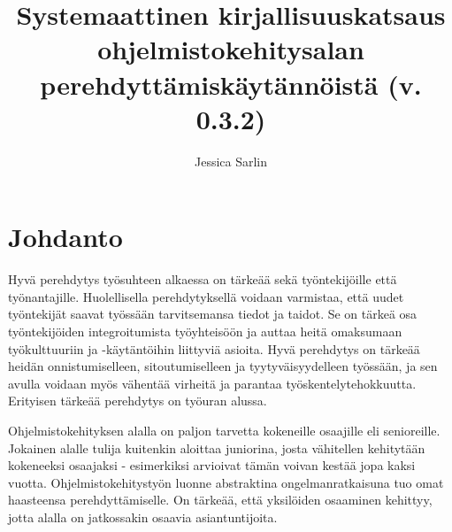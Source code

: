 \documentclass[utf8]{gradu3}
\begin{document}
\title{Systemaattinen kirjallisuuskatsaus ohjelmistokehitysalan perehdyttämiskäytännöistä (v. 0.3.2)}



\author{Jessica Sarlin}


\maketitle

\mainmatter

\chapter{Johdanto}



Hyvä perehdytys työsuhteen alkaessa on tärkeää sekä työntekijöille että työnantajille. Huolellisella perehdytyksellä voidaan varmistaa, että uudet työntekijät saavat työssään tarvitsemansa tiedot ja taidot. Se on tärkeä osa työntekijöiden integroitumista työyhteisöön ja auttaa heitä omaksumaan työkulttuuriin ja -käytäntöihin liittyviä asioita. Hyvä perehdytys on tärkeää heidän onnistumiselleen, sitoutumiselleen ja tyytyväisyydelleen työssään, ja sen avulla voidaan myös vähentää virheitä ja parantaa työskentelytehokkuutta. Erityisen tärkeää perehdytys on työuran alussa.

Ohjelmistokehityksen alalla on paljon tarvetta kokeneille osaajille eli senioreille. Jokainen alalle tulija kuitenkin aloittaa juniorina, josta vähitellen kehitytään kokeneeksi osaajaksi - esimerkiksi \textcite{bologa-lupu-2014} arvioivat tämän voivan kestää jopa kaksi vuotta. Ohjelmistokehitystyön luonne abstraktina ongelmanratkaisuna tuo omat haasteensa perehdyttämiselle. On tärkeää, että yksilöiden osaaminen kehittyy, jotta alalla on jatkossakin osaavia asiantuntijoita.
\end{document}
